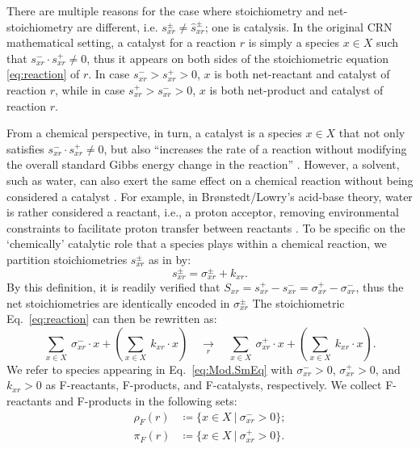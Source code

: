 \documentclass[pdflatex]{sn-jnl}
\theoremstyle{thmstyleone}%
\theoremstyle{examplesty}%
\theoremstyle{thmstylethree}%
\newcommand{\SM}{S}
\newcommand{\net}[1]{\hat{#1}}
\newcommand{\feducts}{\rho_F}
\newcommand{\fproducts}{\pi_F}
\newcommand{\PFS}[1]{\begingroup\color{cyan}#1\endgroup}
\newcommand{\holy}[1]{\begingroup\color{royalpurple}#1\endgroup}
\newcommand{\NV}[1]{\begingroup\color{teal}#1\endgroup}
\begin{document}
\PFS{There are multiple reasons for the case} where stoichiometry and 
net-stoichiometry are different, i.e. $s^{\pm}_{xr}\neq \net{s}^{\pm}_{xr}$; 
one is \NV{catalysis}. In the original CRN \NV{mathematical} setting, a
catalyst for a reaction $r$ is \NV{simply} a species $x\in X$ such that
$s^{-}_{xr}\cdot s^{+}_{xr}\neq 0$, thus it appears on both sides of the
stoichiometric equation \eqref{eq:reaction} of $r$. In case $s^-_{xr}>s^+_{xr}>0$, $x$
is both \holy{net-reactant} and catalyst of reaction $r$, while in case
$s^+_{xr}>s^-_{xr}>0$, $x$ is both \holy{net-product} and catalyst of reaction $r$. 

\holy{From a chemical perspective, in turn,} a catalyst is a species $x\in X$ that not only satisfies 
$s^{-}_{xr}\cdot s^{+}_{xr}\neq 0$, but also ``increases the rate of a reaction without 
modifying the overall standard Gibbs energy change in the reaction'' \cite{gold_iupac_2025}. 
However, a solvent, such as water, can also \holy{exert the same effect on a chemical reaction} 
without being considered a catalyst \cite{marx_nature_1999}. For example, in Br{\o}nstedt/Lowry's 
acid-base theory, water is rather considered a reactant, i.e., a proton acceptor, removing environmental
constraints to facilitate proton transfer between reactants \cite{eigen_proton_1964}. \NV{To be specific 
on the `chemically' catalytic role} that a species plays within a chemical reaction, we partition 
stoichiometries $s^{\pm}_{xr}$ as in
\cite{golnik_bridging_2026} by:
\begin{equation}
	 s^{\pm}_{xr}=\sigma^{\pm}_{xr} + k_{xr}.
\end{equation}
By this definition, it is readily verified that $\SM_{xr} =
s^+_{xr}-s^-_{xr} = \sigma^+_{xr} - \sigma^-_{xr}$, thus the net
stoichiometries are identically encoded in $\sigma^{\pm}_{xr}$ The stoichiometric Eq.~\ref{eq:reaction}
can then be rewritten as:
\begin{equation}\label{eq:Mod.SmEq}
  \sum_{x\in X}\ \sigma^-_{xr} \cdot x + \left(\sum_{x\in X}\ k_{xr}
  \cdot x\right)\quad\underset{r}\rightarrow \quad \sum_{x\in X} \ \sigma^+_{xr} \cdot x +
  \left(\sum_{x\in X}\ k_{xr} \cdot x\right).
\end{equation}
We refer to species appearing in Eq.~\ref{eq:Mod.SmEq} with
$\sigma^{-}_{xr}>0$, $\sigma^{+}_{xr}>0$, and $k_{xr}>0$ as F-reactants,
F-products, and F-catalysts, respectively. We collect F-reactants and
F-products in the following sets:
\begin{equation}
  \begin{split}
    \feducts(r) & \coloneqq \{x\in X \ | \ \sigma^-_{xr} > 0\}; \\
    \fproducts(r) & \coloneqq \{x\in X \ | \ \sigma^+_{xr} > 0\}. \\
  \end{split}
\end{equation} 
\end{document}
